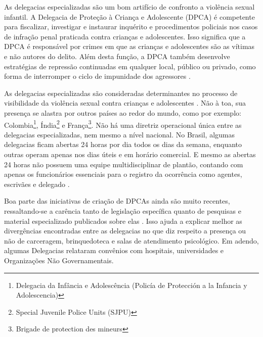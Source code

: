 As delegacias especializadas são um bom artifício de confronto a violência sexual infantil. A Delegacia de Proteção à Criança e Adolescente (DPCA) é competente para fiscalizar, investigar e instaurar inquérito e procedimentos policiais nos casos de infração penal praticada contra crianças e adolescentes. Isso significa que a DPCA é responsável por crimes em que as crianças e adolescentes são as vítimas e não autores do delito. Além desta função, a DPCA também desenvolve estratégias de repressão continuadas em qualquer local, público ou privado, como forma de interromper o ciclo de impunidade dos agressores \cite{rodrigues2014}. %

As delegacias especializadas são consideradas determinantes no processo de visibilidade da violência sexual contra crianças e adolescentes \cite{plano2013}. Não à toa, sua presença se alastra por outros países ao redor do mundo, como por exemplo: Colombia\footnote{Delegacia da Infância e Adolescência (Policía de Protección a la Infancia y Adolescencia)}, Índia\footnote{Special Juvenile Police Units (SJPU)} e França\footnote{Brigade de protection des mineurs}.
Não há uma diretriz operacional única entre as delegacias especializadas, nem mesmo a nível nacional. No Brasil, algumas delegacias ficam abertas 24 horas por dia todos os dias da semana, enquanto outras operam apenas nos dias úteis e em horário comercial. E mesmo as abertas 24 horas não possuem uma equipe multidisciplinar de plantão, contando com apenas os funcionários essenciais para o registro da ocorrência como agentes, escrivães e delegado \cite{novo2016}. 

Boa parte das iniciativas de criação de DPCAs ainda são muito recentes, ressaltando-se a carência tanto de legislação específica quanto de pesquisas e material especializado publicados sobre elas \cite{novo2016}. Isso ajuda a explicar melhor as divergências encontradas entre as delegacias no que diz respeito a presença ou não de carceragem, brinquedoteca e salas de atendimento psicológico. 
Em adendo, algumas Delegacias relataram convênios com hospitais, universidades e Organizações Não Governamentais.

